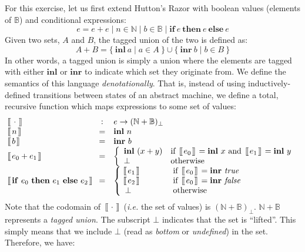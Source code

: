 \documentclass[10pt,a4paper]{exam}
\newcommand {\lbrac} {\makebox[0pt]{[\kern-1ex[}}
\newcommand {\rbrac} {\makebox[0pt]{]\kern-1ex]}}
\newcommand{\denote}[1]{\lbrac~#1~\rbrac}
\begin{document}
\begin{questions}
For this exercise, let us first extend Hutton's Razor with boolean values (elements of $\mathbb{B}$) and conditional expressions:
\begin{displaymath}
e = e + e \mid n \in \mathbb{N} \mid b \in \mathbb{B} \mid \mathbf{if}~e~\mathbf{then}~e~\mathbf{else}~e
\end{displaymath}
Given two sets, $A$ and $B$, the tagged union of the two is defined as:
\begin{displaymath}
A + B = \{~\mathbf{inl}~a \mid a \in A~\} \cup \{~\mathbf{inr}~b \mid b \in B~\}
\end{displaymath}  
In other words, a tagged union is simply a union where the elements are tagged with either $\mathbf{inl}$ or $\mathbf{inr}$ to indicate which set they originate from.
We define the semantics of this language \emph{denotationally}. That is, instead of using inductively-defined transitions between states of an abstract machine, we define a total, recursive function which maps expressions to some set of values:
\begin{displaymath}
\begin{array}{lcl}
\denote{\cdot} & : & e \to (\mathbb{N} + \mathbb{B})_{\bot}\\
\denote{n}         & = & \mathbf{inl}~n \\
\denote{b}         & = & \mathbf{inr}~b \\
\denote{e_0 + e_1} & = & \left\{ \begin{array}{ll}
\mathbf{inl}~(x + y) & \text{if } ~\denote{e_0}~ = \mathbf{inl}~x \text{ and } ~\denote{e_1}~ = \mathbf{inl}~y \\
\bot & \text{otherwise}
\end{array}  \right.\\
\denote{\mathbf{if}~e_0~\mathbf{then}~e_1~\mathbf{else}~e_2} & = & \left\{\begin{array}{ll}
\denote{e_1} & \qquad \quad \; \text{if } ~\denote{e_0}~ = \mathbf{inr}~\mathit{true}\\
\denote{e_2} & \qquad \quad \; \text{if } ~\denote{e_0}~ = \mathbf{inr}~\mathit{false}\\
\bot         & \qquad \quad \; \text{otherwise}
\end{array}\right.
\end{array}
\end{displaymath}
Note that the codomain of $~\denote{\cdot}~$ (\emph{i.e.} the set of values) is $(\mathbb{N} + \mathbb{B})_{\bot}$. $\mathbb{N} + \mathbb{B}$ represents a \emph{tagged union}.
The subscript $\bot$ indicates that the set is ``lifted''. This simply means that we include $\bot$ (read as \emph{bottom} or \emph{undefined}) in the set. Therefore, we have:

\end{questions}
\end{document}
